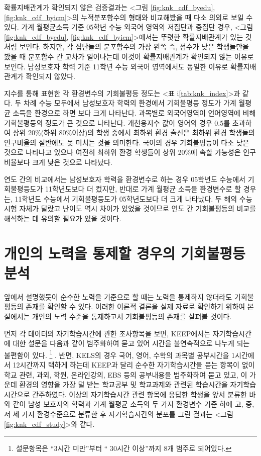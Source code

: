 확률지배관계가 확인되지 않은 검증결과는 <그림 \ref{fig:knk_cdf_byedu}, \ref{fig:knk_cdf_byicm}>의 누적분포함수의 형태와 비교해봤을 때 다소 의외로 보일 수 있다.
가계 월평균소득 기준 05학년 수능 외국어 영역의 저집단과 중집단 경우, <그림 \ref{fig:knk_cdf_byedu}, \ref{fig:knk_cdf_byicm}>에서는 뚜렷한 확률지배관계가 있는 것처럼 보인다.
하지만, 각 집단들의 분포함수의 가장 왼쪽 즉, 점수가 낮은 학생들만을 봤을 때 분포함수 간 교차가 일어나는데 이것이 확률지배관계가 확인되지 않는 이유로 보인다.
남성보호자 학력 기준 11학년 수능 외국어 영역에서도 동일한 이유로 확률지배관계가 확인되지 않았다. 



지수를 통해 표현한 각 환경변수의 기회불평등 정도는 <표 i\ref{tab:knk_index}>과 같다.
두 차례 수능 모두에서 남성보호자 학력의 환경에서 기회불평등 정도가 가계 월평균 소득을 환경으로 하면 보다 크게 나타난다.
 과목별로 외국어영역이 언어영역에 비해 기회불평등의 정도가 큰 것으로 나타난다.
 개천용지수 값이 영어의 경우 0.5를 초과하여 상위 20\%(하위 80\%이상)의 학생 중에서 최하위 환경 출신은 최하위 환경 학생들의 인구비율의 절반에도 못 미치는 것을 의미한다.
 국어의 경우 기회불평등이 다소 낮은 것으로 나타나고 있으나 여전히 최하위 환경 학생들이 상위 20\%에 속할 가능성은 인구비율보다 크게 낮은 것으로 나타났다.

연도 간의 비교에서는 남성보호자 학력을 환경변수로 하는 경우 05학년도 수능에서 기회불평등도가 11학년도보다 더 컸지만, 반대로 가계 월평균 소득을 환경변수로 할 경우는, 11학년도 수능에서 기회불평등도가 05학년도보다 더 크게 나타났다.
 두 해의 수능시험 자체가 달랐고 난이도 역시 차이가 있었을 것이므로 연도 간 기회불평등의 비교를 해석하는 데 유의할 필요가 있을 것이다.
 
\section{개인의 노력을 통제할 경우의 기회불평등 분석}
앞에서 설명했듯이 순수한 노력을 기준으로 할 때는 노력을 통제하지 않더라도 기회불평등의 존재를 확인할 수 있다.
이러한 이론적 결론을 실제 자료로 확인하기 위하여 본 절에서는 개인의 노력 수준을 통제하고서 기회불평등의 존재를 살펴볼 것이다.

먼저 각 데이터의 자기학습시간에 관한 조사항목을 보면, KEEP에서는 자기학습시간에 대한 설문을 다음과 같이 범주화하여 묻고 있어 시간을 불연속적으로 나누게 되는 불편함이 있다.
 \footnote{설문항목은 “3시간 미만”부터 “ 30시간 이상”까지 8개 범주로 되어있다.}
. 반면, KELS의 경우 국어, 영어, 수학의 과목별 공부시간을 1시간에서 12시간까지 택하게 하는데 KEEP과 달리 순수한 자기학습시간을 묻는 항목이 없이 학교 관련, 과외, 학원, 온라인강의, EBS 등의 공부내용을 범주화하여 묻고 있고, 이 가운데 환경의 영향을 가장 덜 받는 학교공부 및 학교과제와 관련된 학습시간을 자기학습시간으로 간주하였다.
 이상의 자기학습시간 관련 항목에 응답한 학생을 앞서 분류한 바와 같이 남성 보호자의 학력과 가계 월평균 소득의 두 가지 환경변수 기준 하에 고, 중, 저 세 가지 환경수준으로 분류한 후 자기학습시간의 분포를 그린 결과는 <그림 \ref{fig:knk_cdf_study}>와 같다.

